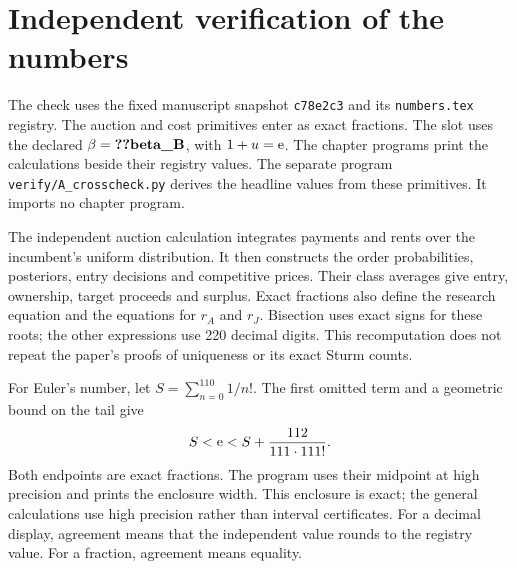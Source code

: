 \clearpage
\section{Independent verification of the numbers}\label{sec:A_verification}

The check uses the fixed manuscript snapshot \texttt{c78e2c3} and its \texttt{numbers.tex} registry.
The auction and cost primitives enter as exact fractions.
The slot uses the declared \(\beta=\reg{beta_B}\), with \(1+u=\mathrm{e}\).
The chapter programs print the calculations beside their registry values.
The separate program \texttt{verify/A\_crosscheck.py} derives the headline values from these primitives.
It imports no chapter program.

The independent auction calculation integrates payments and rents over the incumbent's uniform distribution.
It then constructs the order probabilities, posteriors, entry decisions and competitive prices.
Their class averages give entry, ownership, target proceeds and surplus.
Exact fractions also define the research equation and the equations for \(r_A\) and \(r_J\).
Bisection uses exact signs for these roots; the other expressions use 220 decimal digits.
This recomputation does not repeat the paper's proofs of uniqueness or its exact Sturm counts.

For Euler's number, let \(S=\sum_{n=0}^{110}1/n!\).
The first omitted term and a geometric bound on the tail give
\[
 S<\mathrm{e}<S+\frac{112}{111\cdot111!}.
\]
Both endpoints are exact fractions.
The program uses their midpoint at high precision and prints the enclosure width.
This enclosure is exact; the general calculations use high precision rather than interval certificates.
For a decimal display, agreement means that the independent value rounds to the registry value.
For a fraction, agreement means equality.


